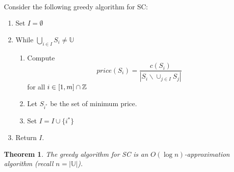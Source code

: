 \documentclass[letterpaper,12pt,oneside,onecolumn]{article}
\newcommand{\U}{\mathbb{U}}
\newtheorem{theorem}[fact]{Theorem}
\begin{document}
\paragraph{}
Consider the following greedy algorithm for SC:
\begin{enumerate}
\item Set $I = \emptyset$
\item While $\bigcup_{i \in I} S_i \neq \U$
	\begin{enumerate}
	\item Compute $$price(S_i) = \frac{c(S_i)}{|S_i \backslash \cup_{j\in I} S_j|}$$ for all $i \in [1,m]\cap \mathbb{Z}$
	\item Let $S_{i^*}$ be the set of minimum price.
	\item Set $I = I \cup \{i^*\}$
	\end{enumerate}
\item Return $I$.
\end{enumerate}
\begin{theorem}
The greedy algorithm for SC is an $O(\log n)$-approximation algorithm (recall $n = |\U|$).
\end{theorem}
\end{document}
